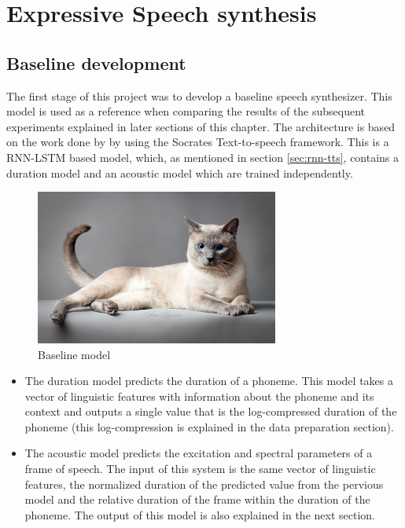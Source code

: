 \chapter{Expressive Speech synthesis}


\section{Baseline development}

The first stage of this project was to develop a baseline speech synthesizer. This model is used as a reference when comparing the results of the subsequent experiments explained in later sections of this chapter. The architecture is based on the work done by \cite{santi06} by using the Socrates Text-to-speech framework. This is a RNN-LSTM based model, which, as mentioned in section \ref{sec:rnn-tts}, contains a duration model and an acoustic model which are trained independently.

\begin{figure}[h]
    \centering
    \includegraphics[width=8cm]{figures/cat}
    \caption{Baseline model}
    \label{fig:lstm-tts}
\end{figure}

\begin{itemize}
    \item The duration model predicts the duration of a phoneme. This model takes a vector of linguistic features with information about the phoneme and its context and outputs a single value that is the log-compressed duration of the phoneme (this log-compression is explained in the data preparation section).
    \item The acoustic model predicts the excitation and spectral parameters of a frame of speech. The input of this system is the same vector of linguistic features, the normalized duration of the predicted value from the pervious model and the relative duration of the frame within the duration of the phoneme. The output of this model is also explained in the next section.
\end{itemize}

